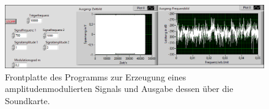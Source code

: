 \documentclass[
a4paper,
12pt,
pagesize,
ngerman
]{scrartcl}
\begin{document}
	\begin{figure}[H]  
		\includegraphics[width=1\textwidth]{EIRE2018Dateien/Tag3/Soundkarteoutoszi/AMp}
		\centering
		\caption{
			Frontplatte des Programms zur Erzeugung eines amplitudenmodulierten Signals und Ausgabe dessen über die Soundkarte.
		}
		\label{fig_tag3_am_soundkarte_front}
		\centering
	\end{figure}

	
\iffalse %
\end{document}
